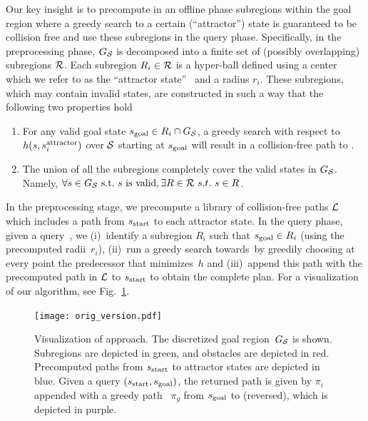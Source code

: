 \documentclass[a4paper]{report}
\begin{document}
Our key insight is to precompute in an offline phase subregions within the goal region where a greedy search to a certain (``attractor'') state is guaranteed to be collision free and use these subregions in the query phase.
Specifically, in the preprocessing phase, $G_\mathcal{S}$ is decomposed into a finite  set of (possibly overlapping) subregions $\mathcal{R}$.
Each subregion $R_i \in \mathcal{R}$ is a hyper-ball defined using a center which we refer to as the ``attractor state''~
\sAttract and a radius $r_i$.
These subregions, which may contain invalid states, are constructed in such a way that the following two properties hold
\begin{enumerate}[label={\textbf{P\arabic*}}]
  \item \label{property:1} For any valid goal state $s_{\text{goal}} \in R_i \cap G_\mathcal{S}$, a greedy search with respect to $h(s, s^{\text{attractor}}_i)$ over $\mathcal{S}$ starting at $s_{\text{goal}}$ will result in a collision-free path to \sAttract.
  \item \label{property:2} The union of all the subregions completely cover the valid states in $G_\mathcal{S}$. 
      Namely, $\forall s \in G_\mathcal{S}~\text{s.t.}~s~\text{is valid}, \exists R \in \mathcal{R} \ s.t. \ s \in R$.
\end{enumerate}

In the preprocessing stage, we precompute a library of collision-free paths $\mathcal{L}$ which includes a path from $s_{\textrm{start}}$ to each attractor state. 
In the query phase, given a query~\sGoal, we 
(i)~identify a subregion $R_i$ such that $s_{\text{goal}} \in R_i$ (using the precomputed radii~$r_i$),
(ii)~run a greedy search towards~\sAttract by greedily choosing at every point the predecessor that minimizes~$h$ and
(iii)~append this path with the precomputed path in $\mathcal{L}$ to $s_{\textrm{start}}$ to obtain the complete plan.
For a visualization of our algorithm, see Fig.~\ref{fig:approach}.


\begin{figure}
\centering
\texttt{[image: orig\_version.pdf]}
  \caption{
  Visualization of approach. The discretized goal region~$G_\mathcal{S}$ is shown. Subregions are depicted in green, and  obstacles are depicted in red.
  Precomputed paths from $s_{\rm{start}}$ to attractor states are depicted in blue.
 Given a query $(s_{\rm{start}}, s_{\rm{goal}})$, the returned path is given by $\pi_i$ appended with a greedy path ~$\pi_g$ from $s_{\rm{goal}}$ to \sAttract (reversed), which is depicted in purple.
}
    \label{fig:approach}
\end{figure}
\end{document}
